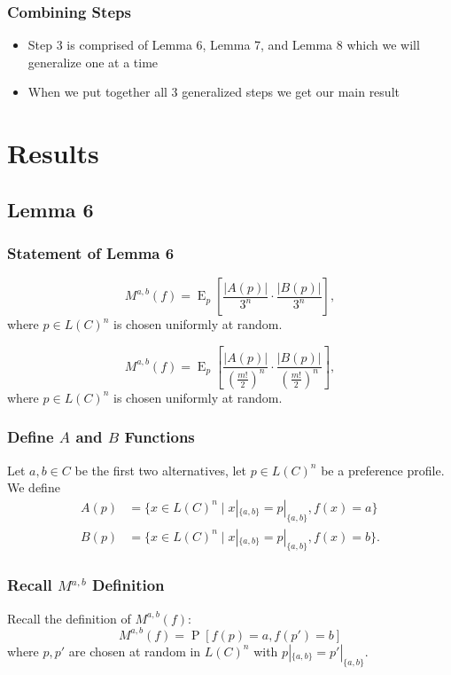 \documentclass[aspectratio=169]{beamer}
\DeclareMathOperator{\probability}{P}
\DeclareMathOperator{\expectedvalue}{E}
\begin{document}
		\begin{frame}
			\frametitle{Combining Steps}

			\begin{itemize}
				\item Step 3 is comprised of Lemma 6, Lemma 7, and Lemma 8 which we will generalize one at a time
				\item When we put together all 3 generalized steps we get our main result
			\end{itemize}
		\end{frame}

	\section{Results}
	\subsection{Lemma 6}

		\begin{frame}
			\frametitle{Statement of Lemma 6}

			\begin{lemma}
				\[
					M^{a,b}(f) = \expectedvalue_{p} \left[ \frac{|A(p)|}{3^n} \cdot \frac{|B(p)|}{3^n} \right],
				\]
				where $p \in L(C)^n$ is chosen uniformly at random.
			\end{lemma}

			\begin{lemma}
				\[
					M^{a,b}(f) = \expectedvalue_{p} \left[ \frac{|A(p)|}{\left(\frac{m!}{2}\right)^n} \cdot \frac{|B(p)|}{\left(\frac{m!}{2}\right)^n} \right],
				\]
				where $p \in L(C)^n$ is chosen uniformly at random.
			\end{lemma}
		\end{frame}

		\begin{frame}
			\frametitle{Define $A$ and $B$ Functions}

			Let $a, b \in C$ be the first two alternatives, let $p \in L(C)^n$ be a preference profile. We define
			\begin{align*}
				A(p) &= \{x \in L(C)^n \mid x|_{\{a,b\}} = p|_{\{a,b\}}, f(x) = a\} \\
				B(p) &= \{x \in L(C)^n \mid x|_{\{a,b\}} = p|_{\{a,b\}}, f(x) = b\}.
			\end{align*}
		\end{frame}

		\begin{frame}
			\frametitle{Recall $M^{a,b}$ Definition}

			Recall the definition of $M^{a,b}(f)$:
			\[
				M^{a,b}(f) = \probability[f(p) = a, f(p') = b]
			\]
			where $p, p'$ are chosen at random in $L(C)^n$ with $p|_{\{a,b\}} = p'|_{\{a,b\}}$.
		\end{frame}
\end{document}
